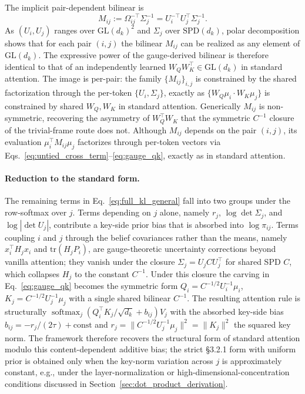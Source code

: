 \documentclass[twoside,11pt]{article}
\begin{document}
The implicit pair-dependent bilinear is
\begin{equation}
M_{ij} := \Omega_{ij}^{-\top}\Sigma_j^{-1} = U_i^{-\top} U_j^\top \Sigma_j^{-1}.
\label{eq:gauge_bilinear}
\end{equation}
As $(U_i, U_j)$ ranges over $\mathrm{GL}(d_k)^2$ and $\Sigma_j$ over $\mathrm{SPD}(d_k)$, polar decomposition shows that for each pair $(i,j)$ the bilinear $M_{ij}$ can be realized as any element of $\mathrm{GL}(d_k)$. The expressive power of the gauge-derived bilinear is therefore identical to that of an independently learned $W_Q W_K^\top \in \mathrm{GL}(d_k)$ in standard attention. The image is per-pair: the family $\{M_{ij}\}_{i,j}$ is constrained by the shared factorization through the per-token $\{U_i, \Sigma_j\}$, exactly as $\{W_Q\mu_i \cdot W_K \mu_j\}$ is constrained by shared $W_Q, W_K$ in standard attention. Generically $M_{ij}$ is non-symmetric, recovering the asymmetry of $W_Q^\top W_K$ that the symmetric $C^{-1}$ closure of the trivial-frame route does not. Although $M_{ij}$ depends on the pair $(i,j)$, its evaluation $\mu_i^\top M_{ij}\mu_j$ factorizes through per-token vectors via Eqs.~\eqref{eq:untied_cross_term}--\eqref{eq:gauge_qk}, exactly as in standard attention.

\paragraph{Reduction to the standard form.}
The remaining terms in Eq.~\eqref{eq:full_kl_general} fall into two groups under the row-softmax over $j$. Terms depending on $j$ alone, namely $r_j$, $\log\det\Sigma_j$, and $\log|\det U_j|$, contribute a key-side prior bias that is absorbed into $\log\pi_{ij}$. Terms coupling $i$ and $j$ through the belief covariances rather than the means, namely $x_i^\top H_j x_i$ and $\mathrm{tr}(H_j P_i)$, are gauge-theoretic uncertainty corrections beyond vanilla attention; they vanish under the closure $\Sigma_j = U_j C U_j^\top$ for shared SPD $C$, which collapses $H_j$ to the constant $C^{-1}$. Under this closure the carving in Eq.~\eqref{eq:gauge_qk} becomes the symmetric form $Q_i = C^{-1/2}U_i^{-1}\mu_i$, $K_j = C^{-1/2}U_j^{-1}\mu_j$ with a single shared bilinear $C^{-1}$. The resulting attention rule is structurally $\operatorname{softmax}_j(Q_i^\top K_j/\sqrt{d_k} + b_{ij}) V_j$ with the absorbed key-side bias $b_{ij} = -r_j/(2\tau) + \text{const}$ and $r_j = \|C^{-1/2}U_j^{-1}\mu_j\|^2 = \|K_j\|^2$ the squared key norm. The framework therefore recovers the structural form of standard attention modulo this content-dependent additive bias; the strict \citet{vaswani2017attention} \S3.2.1 form with uniform prior is obtained only when the key-norm variation across $j$ is approximately constant, e.g., under the layer-normalization or high-dimensional-concentration conditions discussed in Section~\ref{sec:dot_product_derivation}.
\end{document}
